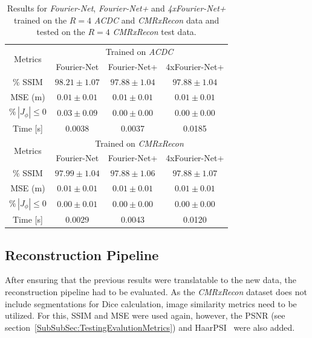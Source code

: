 \begin{table}[H] %
	\centering
	\caption{Results for \emph{Fourier-Net}, \emph{Fourier-Net+} and \emph{4xFourier-Net+} trained on the $R=4$ \emph{ACDC} and \emph{CMRxRecon} data and tested on the $R=4$ \emph{CMRxRecon} test data.}
	\label{tab:DomainTranslation_ACDC_CMRxRecon}
	\begin{tabular}{c c c c} %
		\toprule
		\multirow{2}{*}{Metrics} & \multicolumn{3}{c}{Trained on \emph{ACDC}} \\
		\cmidrule(lr){2-4} 
		 & Fourier-Net & Fourier-Net+ & 4xFourier-Net+\\	
		\midrule
		$\%$ SSIM & $98.21 \pm 1.07$ & $97.88 \pm 1.04$ & $97.88 \pm 1.04$\\
		MSE (m) & $0.01 \pm 0.01$ & $0.01 \pm 0.01$ & $0.01 \pm 0.01$ \\
		$\% \, |J_{\phi}|\leq0$ & $0.03 \pm 0.09$ & $0.00 \pm 0.00$ & $0.00 \pm 0.00$ \\
		Time [s] 	  & 0.0038 & 0.0037 & 0.0185  \\
		\midrule
		\multirow{2}{*}{Metrics} & \multicolumn{3}{c}{Trained on \emph{CMRxRecon}} \\
		\cmidrule(lr){2-4} 
		 & Fourier-Net & Fourier-Net+ & 4xFourier-Net+\\		
		\midrule
		$\%$ SSIM & $97.99 \pm 1.04$ & $97.88 \pm 1.06$ & $97.88 \pm 1.07$\\
		MSE (m) & $0.01 \pm 0.01$ & $0.01 \pm 0.01$ & $0.01 \pm 0.01$ \\
		$\% \, |J_{\phi}|\leq0$ & $0.00 \pm 0.01$ & $0.00 \pm 0.00$ & $0.00 \pm 0.00$ \\
		Time [s] 	  & 0.0029 & 0.0043 & 0.0120  \\
		\bottomrule
	\end{tabular}	
\end{table}

\subsection{Reconstruction Pipeline} \label{SubSec:ResultsReconstructionPipeline}
After ensuring that the previous results were translatable to the new data, the reconstruction pipeline had to be evaluated. As the \emph{CMRxRecon} dataset does not include segmentations for Dice calculation, image similarity metrics need to be utilized. For this, SSIM and MSE were used again, however, the PSNR (see section~\ref{SubSubSec:TestingEvalutionMetrics}) and HaarPSI~\cite{HaarPSI} were also added. 

